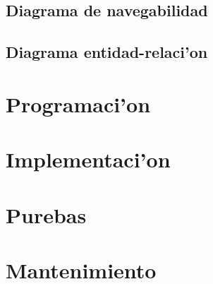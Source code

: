 \subsection{Diagrama de navegabilidad}

\subsection{Diagrama entidad-relaci'on}

\section{Programaci'on}

\section{Implementaci'on}

\section{Purebas}

\section{Mantenimiento}
